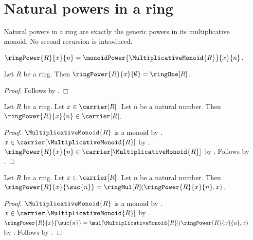 


\section{Natural powers in a ring}

Natural powers in a ring are exactly the generic powers in its multiplicative
monoid.  No second recursion is introduced.

\begin{definition}\label{ring_power}
    $\ringPower{R}{x}{n}=
        \monoidPower{\MultiplicativeMonoid{R}}{x}{n}$.
\end{definition}

\begin{proposition}\label{ring_power_zero}
    Let $R$ be a ring.
    Then $\ringPower{R}{x}{\emptyset}=\ringOne[R]$.
\end{proposition}
\begin{proof}
    Follows by
        .
\end{proof}

\begin{proposition}\label{ring_power_type}
    Let $R$ be a ring.
    Let $x\in\carrier[R]$.
    Let $n$ be a natural number.
    Then $\ringPower{R}{x}{n}\in\carrier[R]$.
\end{proposition}
\begin{proof}
    $\MultiplicativeMonoid{R}$ is a monoid by
        .
    $x\in\carrier[\MultiplicativeMonoid{R}]$ by
        .
    $\ringPower{R}{x}{n}\in
        \carrier[\MultiplicativeMonoid{R}]$ by
        .
    Follows by .
\end{proof}

\begin{proposition}\label{ring_power_successor}
    Let $R$ be a ring.
    Let $x\in\carrier[R]$.
    Let $n$ be a natural number.
    Then $\ringPower{R}{x}{\suc{n}}=
        \ringMul[R](\ringPower{R}{x}{n},x)$.
\end{proposition}
\begin{proof}
    $\MultiplicativeMonoid{R}$ is a monoid by
        .
    $x\in\carrier[\MultiplicativeMonoid{R}]$ by
        .
    $\ringPower{R}{x}{\suc{n}}=
        \mul[\MultiplicativeMonoid{R}](
            \ringPower{R}{x}{n},x)$ by
        .
    Follows by .
\end{proof}

